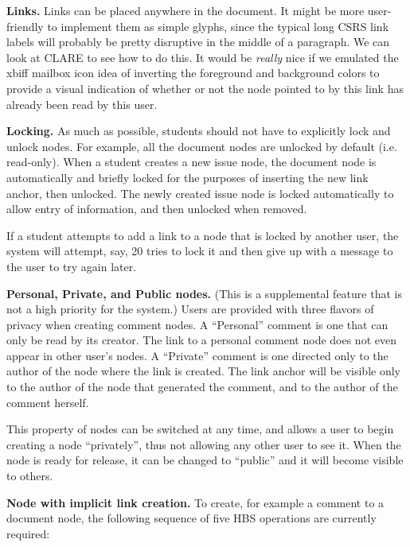\begin{itemizenoindent}
\item {\bf Links.}  Links can be placed anywhere in the document. It
  might be more user-friendly to implement them as simple glyphs, since
  the typical long CSRS link labels will probably be pretty disruptive
  in the middle of a paragraph.  We can look at CLARE to see how to do
  this.  It would be {\em really} nice if we emulated the xbiff mailbox
  icon idea of inverting the foreground and background colors to provide
  a visual indication of whether or not the node pointed to by this link
  has already been read by this user.
  
\item {\bf Locking.} As much as possible, students should not have to
  explicitly lock and unlock nodes. For example, all the document nodes are
  unlocked by default (i.e. read-only).  When a student creates a new issue
  node, the document node is automatically and briefly locked for the
  purposes of inserting the new link anchor, then unlocked.  The newly
  created issue node is locked automatically to allow entry of information,
  and then unlocked when removed.  

  If a student attempts to add a link to a node that is locked by another
  user, the system will attempt, say, 20 tries to lock it and then give up
  with a message to the user to try again later. 
  
\item {\bf Personal, Private, and Public nodes.} (This is a
  supplemental feature that is not a high priority for the system.) Users
  are provided with three flavors of privacy when creating comment nodes.
  A ``Personal'' comment is one that can only be read by its creator.  The
  link to a personal comment node does not even appear in other user's
  nodes.  A ``Private'' comment is one directed only to the author of the
  node where the link is created. The link anchor will be visible only to
  the author of the node that generated the comment, and to the author of
  the comment herself.
  
  This property of nodes can be switched at any time, and allows a user
  to begin creating a node ``privately'', thus not allowing any other user
  to see it.  When the node is ready for release, it can be changed to
  ``public'' and it will become visible to others.

\item {\bf Node with implicit link creation.}  To create, for example a
comment to a document node, the following sequence of five HBS operations are 
currently required:


\end{itemizenoindent}
